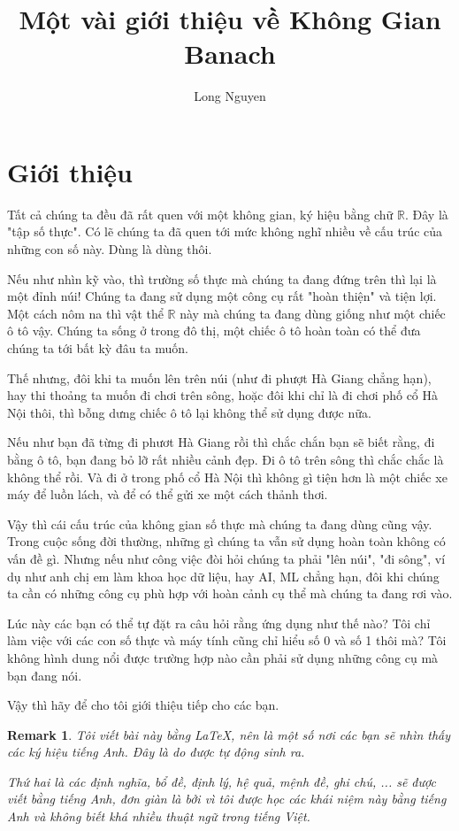 \documentclass[a4paper,12pt]{article}
\title{Một vài giới thiệu về Không Gian Banach}
\date{}
\author{Long Nguyen}
\newtheorem*{remark}{Remark}
\begin{document}
\maketitle

\section{Giới thiệu}

Tất cả chúng ta đều đã rất quen với một không gian, ký hiệu bằng chữ \(\mathbb{R}\). Đây là
"tập số thực".
Có lẽ chúng ta đã quen tới mức không nghĩ nhiều về cấu trúc của những con số này.
Dùng là dùng thôi.

Nếu như nhìn kỹ vào, thì trường số thực mà chúng ta đang đứng trên thì lại là một đỉnh núi!
Chúng ta đang sử dụng một công cụ rất "hoàn thiện" và tiện lợi. Một cách nôm na thì vật thể
\(\mathbb{R}\) này mà chúng ta đang dùng giống như một chiếc ô tô vậy.
Chúng ta sống ở trong đô thị, một chiếc ô tô hoàn toàn có thể đưa chúng ta tới bất kỳ đâu
ta muốn.

Thế nhưng, đôi khi ta muốn lên trên núi (như đi phượt Hà Giang chẳng hạn), hay thi thoảng
ta muốn đi chơi trên sông, hoặc đôi khi chỉ là đi chơi phố cổ Hà Nội thôi, thì bỗng dưng
chiếc ô tô lại không thể sử dụng được nữa.

Nếu như bạn đã từng đi phươt Hà Giang rồi thì chắc chắn bạn sẽ biết rằng, đi bằng ô tô,
bạn đang bỏ lỡ rất nhiều cảnh đẹp. Đi ô tô trên sông thì chắc chắc là không thể rồi.
Và đi ở trong phố cổ Hà Nội thì không gì tiện hơn là một chiếc xe máy để luồn lách,
và để có thể gửi xe một cách thảnh thơi.

Vậy thì cái cấu trúc của không gian số thực mà chúng ta đang dùng cũng vậy. Trong cuộc sống
đời thường, những gì chúng ta vẫn sử dụng hoàn toàn không có vấn đề gì. Nhưng nếu như
công việc đòi hỏi chúng ta phải "lên núi", "đi sông", ví dụ như anh chị em làm khoa học
dữ liệu, hay AI, ML chẳng hạn, đôi khi chúng ta cần có những công cụ phù hợp với hoàn cảnh
cụ thể mà chúng ta đang rơi vào.

Lúc này các bạn có thể tự đặt ra câu hỏi rằng ứng dụng như thế nào? Tôi chỉ làm việc với
các con số thực và máy tính cũng chỉ hiểu số 0 và số 1 thôi mà? Tôi không hình dung nổi được
trường hợp nào cần phải sử dụng những công cụ mà bạn đang nói.

Vậy thì hãy để cho tôi giới thiệu tiếp cho các bạn.
\pagebreak

\begin{remark}
  Tôi viết bài này bằng \LaTeX, nên là một số nơi các bạn sẽ nhìn thấy các ký hiệu
  tiếng Anh. Đây là do được tự động sinh ra.

  Thứ hai là các định nghĩa, bổ đề, định lý, hệ quả, mệnh đề, ghi chú, ... sẽ được
  viết bằng tiếng Anh, đơn giàn là bởi vì tôi được học các khái niệm này bằng tiếng
  Anh và không biết khá nhiều thuật ngữ trong tiếng Việt.
\end{remark}
\end{document}
